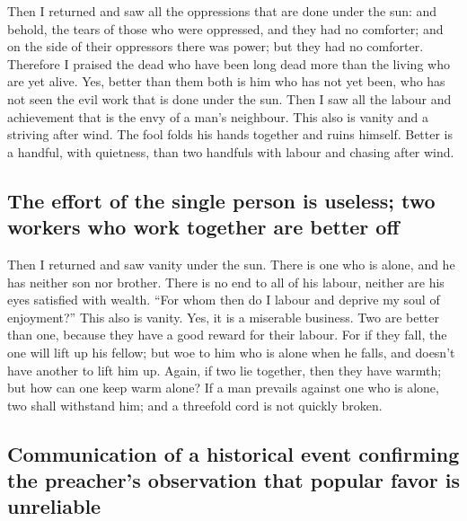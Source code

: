  Then I returned and saw all the oppressions that are done
under the sun: and behold, the tears of those who were oppressed, and
they had no comforter; and on the side of their oppressors there was
power; but they had no comforter.  Therefore I praised the
dead who have been long dead more than the living who are yet alive.
 Yes, better than them both is him who has not yet been,
who has not seen the evil work that is done under the sun.
 Then I saw all the labour and achievement that is the
envy of a man's neighbour. This also is vanity and a striving after
wind.  The fool folds his hands together and ruins
himself.  Better is a handful, with quietness, than two
handfuls with labour and chasing after wind.

\hypertarget{the-effort-of-the-single-person-is-useless-two-workers-who-work-together-are-better-off}{%
\subsection{The effort of the single person is useless; two workers who
work together are better
off}\label{the-effort-of-the-single-person-is-useless-two-workers-who-work-together-are-better-off}}

 Then I returned and saw vanity under the sun.
 There is one who is alone, and he has neither son nor
brother. There is no end to all of his labour, neither are his eyes
satisfied with wealth. ``For whom then do I labour and deprive my soul
of enjoyment?'' This also is vanity. Yes, it is a miserable business.
 Two are better than one, because they have a good reward
for their labour.  For if they fall, the one will lift up
his fellow; but woe to him who is alone when he falls, and doesn't have
another to lift him up.  Again, if two lie together, then
they have warmth; but how can one keep warm alone?  If a
man prevails against one who is alone, two shall withstand him; and a
threefold cord is not quickly broken.

\hypertarget{communication-of-a-historical-event-confirming-the-preachers-observation-that-popular-favor-is-unreliable}{%
\subsection{Communication of a historical event confirming the
preacher's observation that popular favor is
unreliable}\label{communication-of-a-historical-event-confirming-the-preachers-observation-that-popular-favor-is-unreliable}}

